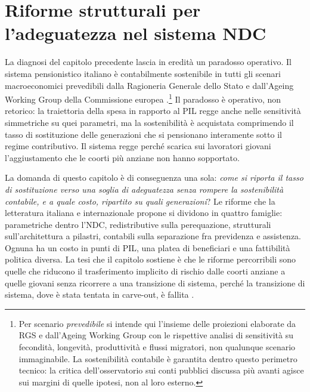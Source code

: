 
\chapter{Riforme strutturali per l'adeguatezza nel sistema NDC}
\label{ch:riforme}

\noindent
La diagnosi del capitolo precedente lascia in eredità un paradosso operativo.
Il sistema pensionistico italiano è contabilmente sostenibile in tutti gli
scenari macroeconomici prevedibili dalla Ragioneria Generale dello Stato e
dall'Ageing Working Group della Commissione europea \cite{MEF_RGS2025,
MEF_RGS2025_NdA, FrancoTommasino2020}.\footnote{Per scenario \emph{prevedibile}
si intende qui l'insieme delle proiezioni elaborate da RGS e dall'Ageing Working
Group con le rispettive analisi di sensitività su fecondità, longevità,
produttività e flussi migratori, non qualunque scenario immaginabile. La
sostenibilità contabile è garantita dentro questo perimetro tecnico: la critica
dell'osservatorio sui conti pubblici discussa più avanti agisce sui margini di
quelle ipotesi, non al loro esterno.} Il paradosso è operativo, non retorico:
la traiettoria della spesa in rapporto al PIL regge anche nelle sensitività
simmetriche su quei parametri, ma la sostenibilità è acquistata comprimendo il
tasso di sostituzione delle generazioni che si pensionano interamente sotto il
regime contributivo. Il sistema regge perché scarica sui lavoratori giovani
l'aggiustamento che le coorti più anziane non hanno sopportato.

\medskip
\noindent
La domanda di questo capitolo è di conseguenza una sola: \emph{come si
riporta il tasso di sostituzione verso una soglia di adeguatezza senza
rompere la sostenibilità contabile, e a quale costo, ripartito su quali
generazioni}? Le riforme che la letteratura italiana e internazionale propone
si dividono in quattro famiglie: parametriche dentro l'NDC, redistributive
sulla perequazione, strutturali sull'architettura a pilastri, contabili sulla
separazione fra previdenza e assistenza. Ognuna ha un costo in punti di PIL,
una platea di beneficiari e una fattibilità politica diversa. La tesi che il
capitolo sostiene è che le riforme percorribili sono quelle che riducono il
trasferimento implicito di rischio dalle coorti anziane a quelle giovani senza
ricorrere a una transizione di sistema, perché la transizione di sistema, dove
è stata tentata in carve-out, è fallita \cite{Altiparmakov2022}.

